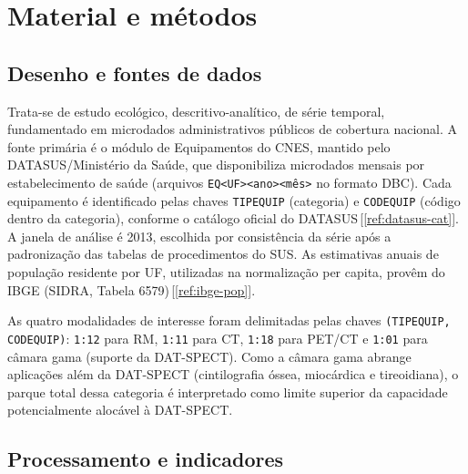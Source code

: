 \documentclass[12pt,a4paper,oneside]{article}
\begin{document}
\section{Material e métodos}

\subsection{Desenho e fontes de dados}

Trata-se de estudo ecológico, descritivo-analítico, de série temporal,
fundamentado em microdados administrativos públicos de cobertura
nacional. A fonte primária é o módulo de Equipamentos do CNES,
mantido pelo DATASUS/Ministério da Saúde, que disponibiliza microdados
mensais por estabelecimento de saúde (arquivos
\texttt{EQ<UF><ano><mês>} no formato DBC). Cada equipamento é
identificado pelas chaves \texttt{TIPEQUIP} (categoria) e
\texttt{CODEQUIP} (código dentro da categoria), conforme o catálogo
oficial do DATASUS\,[\ref{ref:datasus-cat}]. A janela de análise é
2013, escolhida por consistência da série após a
padronização das tabelas de procedimentos do SUS. As estimativas
anuais de população residente por UF, utilizadas na normalização per
capita, provêm do IBGE (SIDRA, Tabela 6579)\,[\ref{ref:ibge-pop}].

As quatro modalidades de interesse foram delimitadas pelas chaves
\texttt{(TIPEQUIP, CODEQUIP)}: \texttt{1:12} para RM, \texttt{1:11}
para CT, \texttt{1:18} para PET/CT e \texttt{1:01} para câmara gama
(suporte da DAT-SPECT). Como a câmara gama abrange aplicações além da
DAT-SPECT (cintilografia óssea, miocárdica e tireoidiana), o parque
total dessa categoria é interpretado como limite superior da
capacidade potencialmente alocável à DAT-SPECT.

\subsection{Processamento e indicadores}
\end{document}
